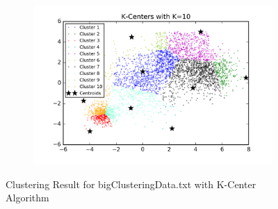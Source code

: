 \begin{figure}[htb]
\begin{subfigure}[b]{0.475\textwidth}
            \includegraphics[width=\textwidth]{./figures/bigClustering_kCenter_10.png}
        \end{subfigure}
        
        \caption{Clustering Result for bigClusteringData.txt with K-Center Algorithm}
        \label{fig:kmean_clustering}
\end{figure}

